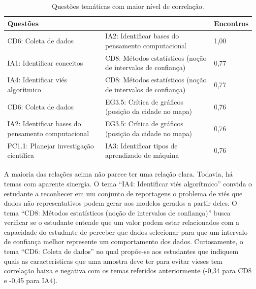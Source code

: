 \documentclass[
]{book}
\begin{document}
\begin{table}

\caption{\label{tab:quadroimpacto5}Questões temáticas com maior nível de correlação.}
\centering
\begin{tabular}[t]{l|l|l}
\hline
Questões &  & Encontros\\
\hline
CD6: Coleta de dados & IA2: Identificar bases do pensamento computacional & 1,00\\
\hline
IA1: Identificar conceitos & CD8: Métodos estatísticos (noção de intervalos de confiança) & 0,77\\
\hline
IA4: Identificar viés algorítmico & CD8: Métodos estatísticos (noção de intervalos de confiança) & 0,77\\
\hline
CD6: Coleta de dados & EG3.5: Crítica de gráficos (posição da cidade no mapa) & 0,76\\
\hline
IA2: Identificar bases do pensamento computacional & EG3.5: Crítica de gráficos (posição da cidade no mapa) & 0,76\\
\hline
PC1.1: Planejar investigação científica & IA3: Identificar tipos de aprendizado de máquina & 0,76\\
\hline
\end{tabular}
\end{table}

A maioria das relações acima não parece ter uma relação clara. Todavia, há temas com aparente sinergia. O tema ``IA4: Identificar viés algorítmico'' convida o estudante a reconhecer em um conjunto de reportagens o problema de viés que dados não representativos podem gerar aos modelos gerados a partir deles. O tema ``CD8: Métodos estatísticos (noção de intervalos de confiança)'' busca verificar se o estudante entende que um valor podem estar relacionados com a capacidade do estudante de perceber que dados selecionar para que um intervalo de confiança melhor represente um comportamento dos dados. Curiosamente, o tema ``CD6: Coleta de dados'' no qual propõe-se aos estudantes que indiquem quais as características que uma amostra deve ter para evitar vieses tem correlação baixa e negativa com os temas referidos anteriormente (-0,34 para CD8 e -0,45 para IA4).
\end{document}
